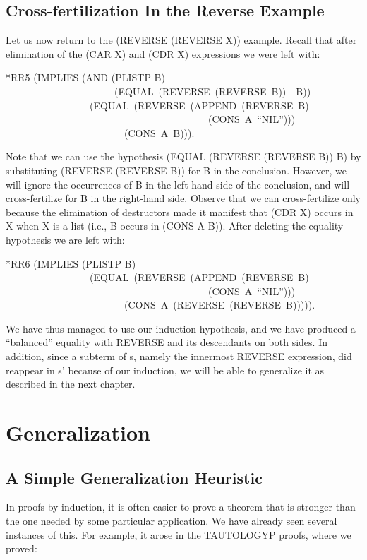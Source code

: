 \documentclass[10pt]{book}
\newenvironment{pubasis}{\begin{flushleft}}{\end{flushleft}}
\begin{document}
\section{Cross-fertilization In the Reverse Example}
Let us now return to the (REVERSE (REVERSE X)) example.
Recall that after elimination of the (CAR X) and (CDR X) expressions
we were left with:

\begin{pubasis}
*RR5	(IMPLIES (AND (PLISTP B)\\
~~~~~~~~~~~~~~~~~~~~~~(EQUAL~(REVERSE~(REVERSE~B))~~B))\\
~~~~~~~~~~~~~~~~~(EQUAL~(REVERSE~(APPEND~(REVERSE~B)\\
~~~~~~~~~~~~~~~~~~~~~~~~~~~~~~~~~~~~~~~~~(CONS~A~``NIL'')))\\
~~~~~~~~~~~~~~~~~~~~~~~~(CONS~A~B))).\\
\end{pubasis}
Note that we can use the hypothesis (EQUAL (REVERSE (REVERSE B)) B) by
substituting (REVERSE (REVERSE B)) for B in the conclusion.  However,
we will ignore the occurrences of B in the left-hand side of
the conclusion, and will cross-fertilize for B in the right-hand side.
Observe that we can cross-fertilize only because the elimination of destructors
made it manifest that (CDR X) occurs in X when X is a list (i.e., B occurs
in (CONS A B)).  After deleting the equality hypothesis we are
left with:

\begin{pubasis}
*RR6	(IMPLIES (PLISTP B)\\
~~~~~~~~~~~~~~~~~(EQUAL~(REVERSE~(APPEND~(REVERSE~B)\\
~~~~~~~~~~~~~~~~~~~~~~~~~~~~~~~~~~~~~~~~~(CONS~A~``NIL'')))\\
~~~~~~~~~~~~~~~~~~~~~~~~(CONS~A~(REVERSE~(REVERSE~B))))).\\
\end{pubasis}
We have thus managed to use our induction hypothesis, and we have
produced a ``balanced'' equality with REVERSE and its descendants on
both sides.  In addition, since a subterm of s, namely the innermost
REVERSE expression, did reappear in s' because of our induction, we
will be able to generalize it as described in the next chapter.

\chapter{Generalization}
\pagestyle{headings}
\label{SECGENERALIZATION}
\section{A Simple Generalization Heuristic}
In proofs by induction, it is often easier to prove a theorem that is
stronger than the one needed by some particular application.  We have already seen
several instances of this.  For example, it arose in the TAUTOLOGYP
proofs, where we proved:
\end{document}
